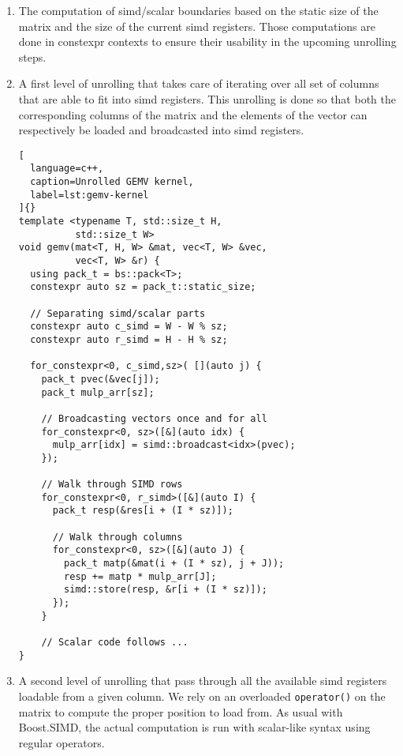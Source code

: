 \documentclass[../main]{subfiles}
\begin{document}
\begin{enumerate}
\item
The computation of \gls{simd}/scalar boundaries based
on the static size of the matrix and the size of the
current \gls{simd} registers. Those computations are done
in constexpr contexts to ensure their usability in the
upcoming unrolling steps.

\item
A first level of unrolling that takes care of iterating
over all set of columns that are able to fit into \gls{simd}
registers. This unrolling is done so that both the
corresponding columns of the matrix and the elements
of the vector can respectively be loaded and broadcasted
into \gls{simd} registers.

\begin{lstlisting}[
  language=c++,
  caption=Unrolled GEMV kernel,
  label=lst:gemv-kernel
]{}
template <typename T, std::size_t H,
          std::size_t W>
void gemv(mat<T, H, W> &mat, vec<T, W> &vec,
          vec<T, W> &r) {
  using pack_t = bs::pack<T>;
  constexpr auto sz = pack_t::static_size;

  // Separating simd/scalar parts
  constexpr auto c_simd = W - W % sz;
  constexpr auto r_simd = H - H % sz;

  for_constexpr<0, c_simd,sz>( [](auto j) {
    pack_t pvec(&vec[j]);
    pack_t mulp_arr[sz];

    // Broadcasting vectors once and for all
    for_constexpr<0, sz>([&](auto idx) {
      mulp_arr[idx] = simd::broadcast<idx>(pvec);
    });

    // Walk through SIMD rows
    for_constexpr<0, r_simd>([&](auto I) {
      pack_t resp(&res[i + (I * sz)]);

      // Walk through columns
      for_constexpr<0, sz>([&](auto J) {
        pack_t matp(&mat(i + (I * sz), j + J));
        resp += matp * mulp_arr[J];
        simd::store(resp, &r[i + (I * sz)]);
      });
    }

    // Scalar code follows ...
}
\end{lstlisting}

\item
A second level of unrolling that pass through all the
available \gls{simd} registers loadable from a given column.
We rely on an overloaded \lstinline{operator()} on the matrix
to compute the proper position to load from. As usual
with Boost.SIMD, the actual computation is run with
scalar-like syntax using regular operators.
\end{enumerate}
\end{document}
